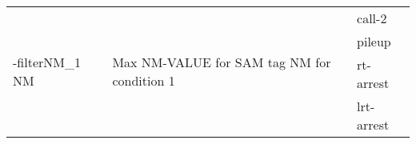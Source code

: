 {\small
\begin{tabular}{@{}p{}p{}l@{}}
\multirow{4}{=}{-filterNM\_1 NM} & \multirow{4}{=}{Max NM-VALUE for SAM tag NM for condition 1} & call-2 \\
 &  & pileup \\
 &  & rt-arrest \\
 &  & lrt-arrest \\
\end{tabular}\\
}
